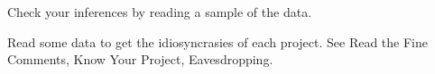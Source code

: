 
Check your inferences by reading a sample of the data.



Read some data to get the idiosyncrasies of each project. See Read the Fine Comments, Know Your Project, Eavesdropping.

